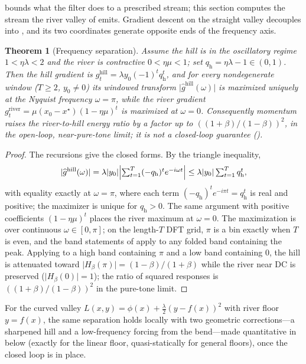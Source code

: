 \documentclass[11pt,a4paper]{article}
\newtheorem{theorem}{Theorem}
\theoremstyle{remark}
\newcommand{\Hmag}[1]{\lvert H_\beta(#1)\rvert}
\begin{document}
 bounds what the filter does to a prescribed stream; this section computes the stream the river valley of  emits.
Gradient descent on the straight valley decouples into , and its two coordinates generate opposite ends of the frequency axis.

\begin{theorem}[Frequency separation]
\label{thm:separation}
Assume the hill is in the oscillatory regime $1<\eta\lambda<2$ and the river is contractive $0<\eta\mu<1$; set $q_{\mathrm{h}}=\eta\lambda-1\in(0,1)$.
Then the hill gradient is $g^{\mathrm{hill}}_t=\lambda y_0(-1)^t q_{\mathrm{h}}^t$, and for every nondegenerate window ($T\ge2$, $y_0\ne0$) its windowed transform $\lvert\hat g^{\mathrm{hill}}(\omega)\rvert$ is maximized uniquely at the Nyquist frequency $\omega=\pi$, while the river gradient $g^{\mathrm{river}}_t=\mu(x_0-x^\star)(1-\eta\mu)^t$ is maximized at $\omega=0$.
Consequently momentum raises the river-to-hill energy ratio by a factor up to $((1+\beta)/(1-\beta))^2$, in the open-loop, near-pure-tone limit; it is not a closed-loop guarantee ().
\end{theorem}

\begin{proof}
The recursions  give the closed forms.
By the triangle inequality,
\[
\lvert\hat g^{\mathrm{hill}}(\omega)\rvert
=\lambda\lvert y_0\rvert\Bigl\lvert\textstyle\sum_{t=1}^{T}(-q_{\mathrm{h}})^t e^{-i\omega t}\Bigr\rvert
\le\lambda\lvert y_0\rvert\textstyle\sum_{t=1}^{T}q_{\mathrm{h}}^t,
\]
with equality exactly at $\omega=\pi$, where each term $(-q_{\mathrm{h}})^t e^{-i\pi t}=q_{\mathrm{h}}^t$ is real and positive; the maximizer is unique for $q_{\mathrm{h}}>0$.
The same argument with positive coefficients $(1-\eta\mu)^t$ places the river maximum at $\omega=0$.
The maximization is over continuous $\omega\in[0,\pi]$; on the length-$T$ DFT grid, $\pi$ is a bin exactly when $T$ is even, and the band statements of  apply to any folded band containing the peak.
Applying  to a high band containing $\pi$ and a low band containing $0$, the hill is attenuated toward $\Hmag{\pi}=(1-\beta)/(1+\beta)$ while the river near DC is preserved ($\Hmag{0}=1$); the ratio of squared responses is $((1+\beta)/(1-\beta))^2$ in the pure-tone limit.
\end{proof}

For the curved valley $L(x,y)=\phi(x)+\tfrac{\lambda}{2}(y-f(x))^2$ with river floor $y=f(x)$, the same separation holds locally with two geometric corrections---a sharpened hill and a low-frequency forcing from the bend---made quantitative in  below (exactly for the linear floor, quasi-statically for general floors), once the closed loop is in place.
\end{document}
